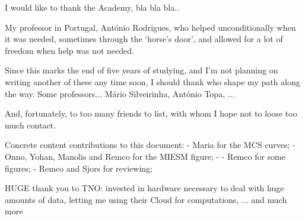 
\begin{acknowledgments} 

I would like to thank the Academy, bla bla bla..


My professor in Portugal, António Rodrigues, who helped unconditionally when it was needed, sometimes through the `horse's door', and allowed for a lot of freedom when help was not needed.

Since this marks the end of five years of studying, and I'm not planning on writing another of these any time soon, I should thank who shape my path along the way.
Some professors... Mário Silveirinha, António Topa, ...

And, fortunately, to too many friends to list, with whom I hope not to loose too much contact.



Concrete content contributions to this document:
- Maria for the MCS curves;
- Onno, Yohan, Manolis and Remco for the MIESM figure;
- 
- Remco for some figures;
- Remco and Sjors for reviewing;


HUGE thank you to TNO: invested in hardware necessary to deal with huge amounts of data, letting me using their Cloud for computations, ... and much more


\end{acknowledgments}
\clearpage
\thispagestyle{empty}
\cleardoublepage